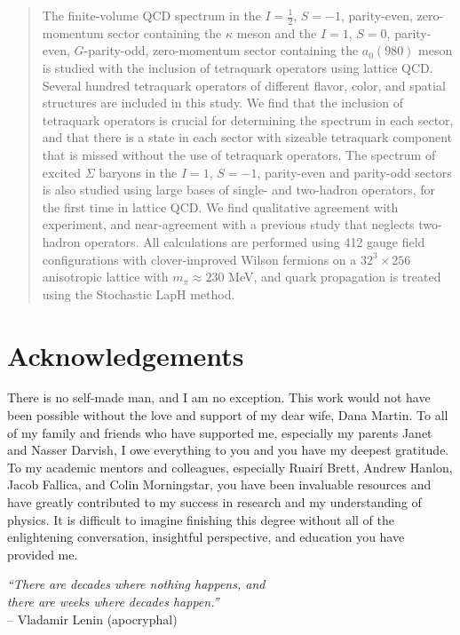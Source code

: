 \documentclass[12pt]{report}
\begin{document}
\onehalfspace


\begin{abstract}
    The finite-volume QCD spectrum in the $I=\frac{1}{2}$, $S=-1$, parity-even, zero-momentum sector containing the $\kappa$ meson and the $I=1$, $S=0$, parity-even, $G$-parity-odd, zero-momentum sector containing the $a_0(980)$ meson is studied with the inclusion of tetraquark operators using lattice QCD. Several hundred tetraquark operators of different flavor, color, and spatial structures are included in this study. We find that the inclusion of tetraquark operators is crucial for determining the spectrum in each sector, and that there is a state in each sector with sizeable tetraquark component that is missed without the use of tetraquark operators. The spectrum of excited $\Sigma$ baryons in the $I=1$, $S=-1$, parity-even and parity-odd sectors is also studied using large bases of single- and two-hadron operators, for the first time in lattice QCD. We find qualitative agreement with experiment, and near-agreement with a previous study that neglects two-hadron operators. All calculations are performed using 412 gauge field configurations with clover-improved Wilson fermions on a $32^3\times 256$ anisotropic lattice with $m_\pi \approx 230$ MeV, and quark propagation is treated using the Stochastic LapH method. 
\end{abstract}

\chapter*{Acknowledgements}
There is no self-made man, and I am no exception. This work would not have been possible without the love and support of my dear wife, Dana Martin. To all of my family and friends who have supported me, especially my parents Janet and Nasser Darvish, I owe everything to you and you have my deepest gratitude. To my academic mentors and colleagues, especially Ruair\'i Brett, Andrew Hanlon, Jacob Fallica, and Colin Morningstar, you have been invaluable resources and have greatly contributed to my success in research and my understanding of physics. It is difficult to imagine finishing this degree without all of the enlightening conversation, insightful perspective, and education you have provided me.
\newpage
\null
\vfill
\begin{flushright}
    \textit{``There are decades where nothing happens, and\\
    there are weeks where decades happen.''}\\
    -- Vladamir Lenin (apocryphal)
\end{flushright}
\vfill
\tableofcontents
\listoffigures
\listoftables
\end{document}

